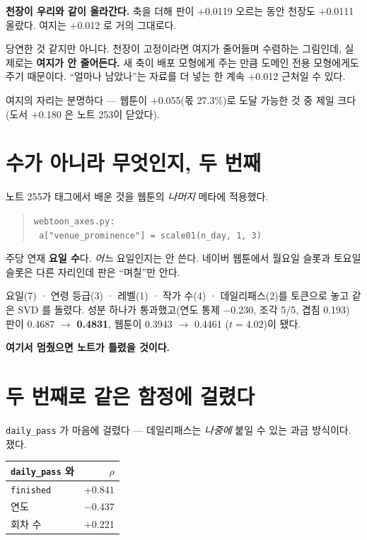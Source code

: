 \documentclass[10pt]{article}
\begin{document}
\textbf{천장이 우리와 같이 올라간다.} 축을 더해 판이 $+$0.0119 오르는 동안
천장도 $+$0.0111 올랐다. 여지는 $+$0.012 로 거의 그대로다.

당연한 것 같지만 아니다. 천장이 고정이라면 여지가 줄어들며 수렴하는 그림인데,
실제로는 \textbf{여지가 안 줄어든다.} 새 축이 배포 모형에게 주는 만큼
도메인 전용 모형에게도 주기 때문이다. ``얼마나 남았나''는 자료를 더 넣는
한 계속 $+$0.012 근처일 수 있다.

여지의 자리는 분명하다 --- 웹툰이 $+$0.055(몫 27.3\%)로 도달 가능한 것 중
제일 크다(도서 $+$0.180 은 노트 253이 닫았다).

\section{수가 아니라 무엇인지, 두 번째}

노트 255가 태그에서 배운 것을 웹툰의 \emph{나머지} 메타에 적용했다.

\begin{quote}\small
\texttt{webtoon\_axes.py:} \\
\texttt{\ a["venue\_prominence"] = scale01(n\_day, 1, 3)}
\end{quote}

주당 연재 \textbf{요일 수}다. \emph{어느} 요일인지는 안 쓴다. 네이버 웹툰에서
월요일 슬롯과 토요일 슬롯은 다른 자리인데 판은 ``며칠''만 안다.

요일(7) · 연령 등급(3) · 레벨(1) · 작가 수(4) · 데일리패스(2)를 토큰으로
놓고 같은 SVD 를 돌렸다. 성분 하나가 통과했고(연도 통제 $-$0.230, 조각 5/5,
겹침 0.193) 판이 0.4687 $\to$ \textbf{0.4831}, 웹툰이 0.3943 $\to$ 0.4461
($t{=}4.02$)이 됐다.

\textbf{여기서 멈췄으면 노트가 틀렸을 것이다.}

\section{두 번째로 같은 함정에 걸렸다}

\texttt{daily\_pass} 가 마음에 걸렸다 --- 데일리패스는 \emph{나중에} 붙일 수
있는 과금 방식이다. 쟀다.

\begin{center}\small
\begin{tabular}{lr}
\hline
\texttt{daily\_pass} 와 & $\rho$ \\
\hline
\texttt{finished} & $\mathbf{+0.841}$ \\
연도 & $-$0.437 \\
회차 수 & $+$0.221 \\
\hline
\end{tabular}
\end{center}
\end{document}
